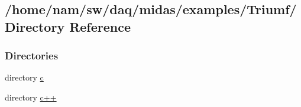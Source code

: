 \subsection{/home/nam/sw/daq/midas/examples/Triumf/ Directory Reference}
\label{dir_b0429a58672f76ea50f1ba586d7ec660}
\subsubsection*{Directories}
\begin{DoxyCompactItemize}
\item 
directory \hyperlink{dir_5b6d33c4e46691d194201415b862e084}{c}
\item 
directory \hyperlink{dir_8c48f48a5cef5f9afc5166fa280a4bf2}{c++}
\end{DoxyCompactItemize}
